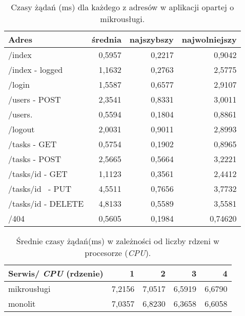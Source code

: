 \begin{table}[h!]
\centering
\caption{Czasy żądań (ms) dla każdego z adresów w aplikacji opartej o mikrousługi.}
\begin{tabular}{|l|r|r|r|}
\hline
\textbf{Adres}  & \textbf{średnia}   & \textbf{najszybszy} & \textbf{najwolniejszy} \\ \hline
/index              & 0,5957	& 0,2217	& 0,9042 \\ \hline
/index - logged     & 1,1632	& 0,2763	& 2,5775 \\ \hline
/login              & 1,5587	& 0,6577	& 2,9107 \\ \hline
/users - POST       & 2,3541	& 0,8331	& 3,0011 \\ \hline
/users.             & 0,5594   	& 0,1804	& 0,8861 \\ \hline
/logout             & 2,0031	& 0,9011	& 2,8993 \\ \hline
/tasks - GET        & 0,5754	& 0,1902	& 0,8965 \\ \hline
/tasks - POST		& 2,5665	& 0,5664	& 3,2221 \\ \hline
/tasks/id - GET		& 1,1123	& 0,3561	& 2,4412 \\ \hline
/tasks/id  - PUT	    & 4,5511	& 0,7656	& 3,7732 \\ \hline
/tasks/id - DELETE  & 4,8133	& 0,5589	& 3,5581 \\ \hline
/404				& 0,5605	& 0,1984	&0,74620 \\ \hline
\end{tabular}
\end{table}

\begin{table}[h!]
\centering
\caption{Średnie czasy żądań(ms) w zależności od liczby rdzeni w procesorze (\textit{CPU}).}
\begin{tabular}{|l|r|r|r|r|}
\hline
\textbf{Serwis/ \textit{CPU} (rdzenie)}       & \textbf{1}	& \textbf{2}	& \textbf{3}	 & \textbf{4} \\ \hline
mikrousługi & 7,2156	& 7,0517	& 6,5919	& 6,6790 \\ \hline
monolit	     & 7,0357	& 6,8230	& 6,3658	& 6,6058 \\ \hline
\end{tabular}
\end{table}



